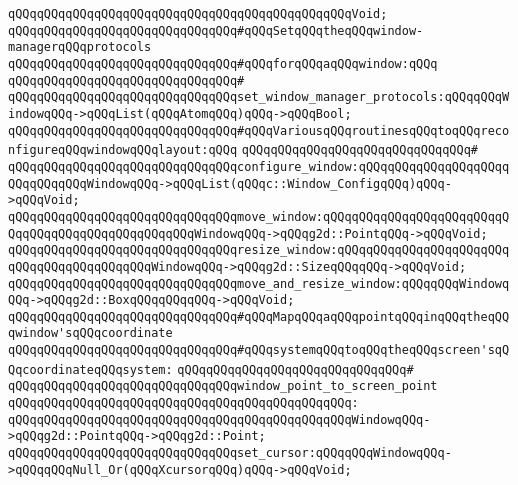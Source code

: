 \verb|qQQqqQQqqQQqqQQqqQQqqQQqqQQqqQQqqQQqqQQqqQQqqQQqVoid;|\newline
\newline
\verb|qQQqqQQqqQQqqQQqqQQqqQQqqQQqqQQq#qQQqSetqQQqtheqQQqwindow-managerqQQqprotocols|\newline
\verb|qQQqqQQqqQQqqQQqqQQqqQQqqQQqqQQq#qQQqforqQQqaqQQqwindow:qQQq|\newline
\verb|qQQqqQQqqQQqqQQqqQQqqQQqqQQqqQQq#|\newline
\verb|qQQqqQQqqQQqqQQqqQQqqQQqqQQqqQQqset_window_manager_protocols:qQQqqQQqWindowqQQq->qQQqList(qQQqAtomqQQq)qQQq->qQQqBool;|\newline
\newline
\verb|qQQqqQQqqQQqqQQqqQQqqQQqqQQqqQQq#qQQqVariousqQQqroutinesqQQqtoqQQqreconfigureqQQqwindowqQQqlayout:qQQq|\newline
\verb|qQQqqQQqqQQqqQQqqQQqqQQqqQQqqQQq#|\newline
\verb|qQQqqQQqqQQqqQQqqQQqqQQqqQQqqQQqconfigure_window:qQQqqQQqqQQqqQQqqQQqqQQqqQQqqQQqWindowqQQq->qQQqList(qQQqc::Window_ConfigqQQq)qQQq->qQQqVoid;|\newline
\verb|qQQqqQQqqQQqqQQqqQQqqQQqqQQqqQQqmove_window:qQQqqQQqqQQqqQQqqQQqqQQqqQQqqQQqqQQqqQQqqQQqqQQqqQQqWindowqQQq->qQQqg2d::PointqQQq->qQQqVoid;|\newline
\verb|qQQqqQQqqQQqqQQqqQQqqQQqqQQqqQQqresize_window:qQQqqQQqqQQqqQQqqQQqqQQqqQQqqQQqqQQqqQQqqQQqWindowqQQq->qQQqg2d::SizeqQQqqQQq->qQQqVoid;|\newline
\verb|qQQqqQQqqQQqqQQqqQQqqQQqqQQqqQQqmove_and_resize_window:qQQqqQQqWindowqQQq->qQQqg2d::BoxqQQqqQQqqQQq->qQQqVoid;|\newline
\newline
\verb|qQQqqQQqqQQqqQQqqQQqqQQqqQQqqQQq#qQQqMapqQQqaqQQqpointqQQqinqQQqtheqQQqwindow'sqQQqcoordinate|\newline
\verb|qQQqqQQqqQQqqQQqqQQqqQQqqQQqqQQq#qQQqsystemqQQqtoqQQqtheqQQqscreen'sqQQqcoordinateqQQqsystem:|\newline
\verb|qQQqqQQqqQQqqQQqqQQqqQQqqQQqqQQq#|\newline
\verb|qQQqqQQqqQQqqQQqqQQqqQQqqQQqqQQqwindow_point_to_screen_point|\newline
\verb|qQQqqQQqqQQqqQQqqQQqqQQqqQQqqQQqqQQqqQQqqQQqqQQq:|\newline
\verb|qQQqqQQqqQQqqQQqqQQqqQQqqQQqqQQqqQQqqQQqqQQqqQQqWindowqQQq->qQQqg2d::PointqQQq->qQQqg2d::Point;|\newline
\newline
\verb|qQQqqQQqqQQqqQQqqQQqqQQqqQQqqQQqset_cursor:qQQqqQQqWindowqQQq->qQQqqQQqNull_Or(qQQqXcursorqQQq)qQQq->qQQqVoid;|\newline
